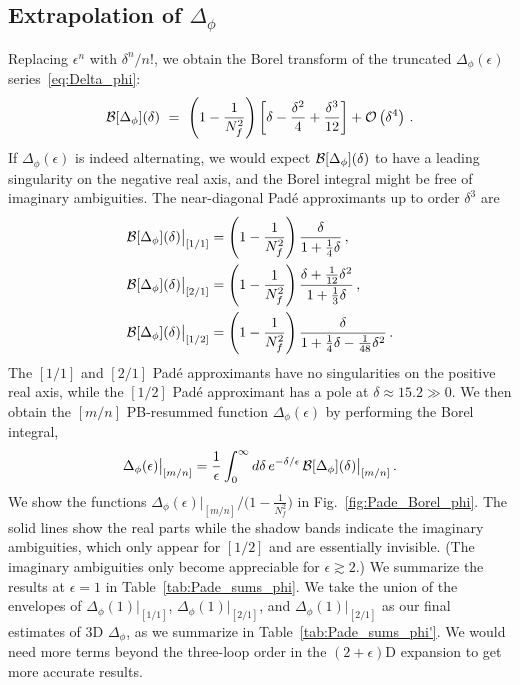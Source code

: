 \documentclass[
 reprint,







nofootinbib,


 amsmath,amssymb,
 aps,
 prd






tightenlines
]{revtex4-2}
\begin{document}
\subsection[Extrapolation of Delta-phi]{Extrapolation of $\Delta_{\phi}$}
\label{sec:delta_phi}



Replacing $\epsilon^n$ with $\delta^n/n!$, we obtain the Borel transform of the truncated $\Delta_{\phi}(\epsilon)$ series~\eqref{eq:Delta_phi}:
\begin{align}
    \calB[\Delta_{\phi}](\delta)\ =\ \left(1-\frac{1}{N_f^2}\right)\left[\delta-\frac{\delta^2}{4}
    +\frac{\delta^3}{12}\right]+\calO\left(\delta^4\right) \,.
\end{align}
If $\Delta_{\phi}(\epsilon)$ is indeed alternating, we would expect $\mathcal{B}[\Delta_{\phi}](\delta)$ to have a leading singularity on the negative real axis, and the Borel integral might be free of imaginary ambiguities.
The near-diagonal Pad\'e approximants up to order $\delta^3$ are
\begin{subequations}
\begin{align}
    \mathcal{B}[\Delta_{\phi}](\delta)\big|_{[1/1]} &=
    \left(1-\frac{1}{N_f^2}\right)
    \frac{\delta}{1+\frac{1}{4}\delta}\,,\\
    \mathcal{B}[\Delta_{\phi}](\delta)\big|_{[2/1]} &=
    \left(1-\frac{1}{N_f^2}\right)
    \frac{\delta + \frac{1}{12}\delta^2}{1+\frac{1}{3}\delta}\,,\\
    \mathcal{B}[\Delta_{\phi}](\delta)\big|_{[1/2]} &=
    \left(1-\frac{1}{N_f^2}\right)
    \frac{\delta}{1+\frac{1}{4}\delta-\frac{1}{48}\delta^2}\,.
\end{align}
\end{subequations}
The $[1/1]$ and $[2/1]$ Pad\'e approximants have no singularities on the positive real axis, while the $[1/2]$ Pad\'e approximant has a pole at $\delta\approx 15.2 \gg 0$.
We then obtain the $[m/n]$ PB-resummed function $\Delta_{\phi}(\epsilon)$ by performing the Borel integral,
\begin{align}
    \Delta_{\phi}(\epsilon)\big|_{[m/n]} =  \frac{1}{\epsilon}  \int_0^{\infty} d \delta\, e^{-\delta/\epsilon}\, \mathcal{B}[\Delta_{\phi}](\delta)\big|_{[m/n]}\,.
\end{align}
We show the functions $\Delta_{\phi}(\epsilon)|_{[m/n]}\big/\bigl(1-\frac{1}{N_f^2}\bigr)$ in Fig.~\ref{fig:Pade_Borel_phi}.
The solid lines show the real parts while the shadow bands indicate the imaginary ambiguities, which only appear for $[1/2]$ and are essentially invisible.  (The imaginary ambiguities only become appreciable for $\epsilon \gtrsim 2$.)
We summarize the results at $\epsilon=1$ in Table~\ref{tab:Pade_sums_phi}.
We take the union of the envelopes of $\Delta_{\phi}(1)|_{[1/1]}$, $\Delta_{\phi}(1)|_{[2/1]}$, and $\Delta_{\phi}(1)|_{[2/1]}$ as our final estimates of 3D $\Delta_{\phi}$, as we summarize in Table~\ref{tab:Pade_sums_phi'}.
We would need more terms beyond the three-loop order in the $(2+\epsilon)$D expansion to get more accurate results.
\end{document}

